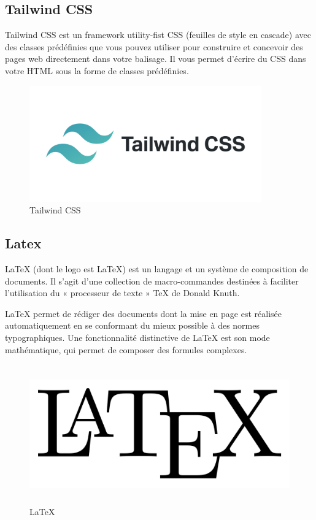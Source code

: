\subsection{Tailwind CSS}

Tailwind CSS est un framework utility-fist CSS (feuilles de style en cascade) avec des classes prédéfinies que vous pouvez utiliser pour construire et concevoir des pages web directement dans votre balisage. Il vous permet d’écrire du CSS dans votre HTML sous la forme de classes prédéfinies.

\begin{figure}[!h]
\begin{center}
\includegraphics[height=5cm]{tailwindcss.png}
\end{center}
\caption{Tailwind CSS}
\end{figure}




\subsection{Latex}

LaTeX (dont le logo est \LaTeX) est un langage et un système de composition de documents. Il s'agit d'une collection de macro-commandes destinées à faciliter l'utilisation du « processeur de texte » TeX de Donald Knuth.

LaTeX permet de rédiger des documents dont la mise en page est réalisée automatiquement en se conformant du mieux possible à des normes typographiques. Une fonctionnalité distinctive de LaTeX est son mode mathématique, qui permet de composer des formules complexes.

\begin{figure}[!h]
\begin{center}
\includegraphics[height=6cm]{LaTeX.svg.png}
\end{center}
\caption{\LaTeX}
\end{figure}

